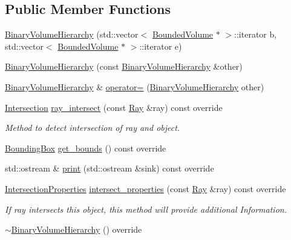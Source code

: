 \subsection*{Public Member Functions}
\begin{DoxyCompactItemize}
\item 
\hyperlink{classBinaryVolumeHierarchy_afb1953933b78a2005884a7a34cb64519}{Binary\+Volume\+Hierarchy} (std\+::vector$<$ \hyperlink{classBoundedVolume}{Bounded\+Volume} $\ast$ $>$\+::iterator b, std\+::vector$<$ \hyperlink{classBoundedVolume}{Bounded\+Volume} $\ast$ $>$\+::iterator e)
\item 
\hyperlink{classBinaryVolumeHierarchy_a4a45b2c778163d01304beb57b6d19bd3}{Binary\+Volume\+Hierarchy} (const \hyperlink{classBinaryVolumeHierarchy}{Binary\+Volume\+Hierarchy} \&other)
\item 
\hyperlink{classBinaryVolumeHierarchy}{Binary\+Volume\+Hierarchy} \& \hyperlink{classBinaryVolumeHierarchy_af15afa9493fbc0d3cfffbbc3c2bfbe99}{operator=} (\hyperlink{classBinaryVolumeHierarchy}{Binary\+Volume\+Hierarchy} other)
\item 
\hyperlink{classIntersection}{Intersection} \hyperlink{classBinaryVolumeHierarchy_aae4af0a21170bb122692314b0fbf399a}{ray\+\_\+intersect} (const \hyperlink{classRay}{Ray} \&ray) const override
\begin{DoxyCompactList}\small\item\em Method to detect intersection of ray and object. \end{DoxyCompactList}\item 
\hyperlink{classBoundingBox}{Bounding\+Box} \hyperlink{classBinaryVolumeHierarchy_aaec23515bc9d81ccc9115489aed8808f}{get\+\_\+bounds} () const override
\item 
std\+::ostream \& \hyperlink{classBinaryVolumeHierarchy_ad92d27372aef59591ddc239685ca770d}{print} (std\+::ostream \&sink) const override
\item 
\hyperlink{classIntersectionProperties}{Intersection\+Properties} \hyperlink{classBinaryVolumeHierarchy_a91c6b8be167dd13ddbb874d4b9f0cedb}{intersect\+\_\+properties} (const \hyperlink{classRay}{Ray} \&ray) const override
\begin{DoxyCompactList}\small\item\em If ray intersects this object, this method will provide additional Information. \end{DoxyCompactList}\item 
\hyperlink{classBinaryVolumeHierarchy_a760800685de78279be3619c4ee4170cf}{$\sim$\+Binary\+Volume\+Hierarchy} () override
\end{DoxyCompactItemize}
